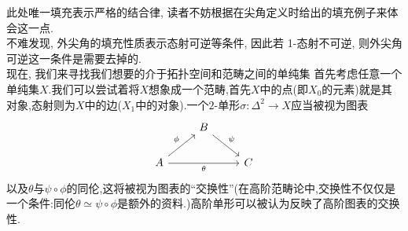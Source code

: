 此处唯一填充表示严格的结合律, 读者不妨根据在尖角定义时给出的填充例子来体会这一点.\\
不难发现, 外尖角的填充性质表示态射可逆等条件, 因此若 1-态射不可逆, 则外尖角可逆这一条件是需要去掉的.\\
现在, 我们来寻找我们想要的介于拓扑空间和范畴之间的单纯集
首先考虑任意一个单纯集$X$.我们可以尝试着将$X$想象成一个范畴,首先$X$中的点(即$X_0$的元素)就是其对象,态射则为$X$中的边($X_1$中的对象).一个$2$-单形$\sigma : \Delta^2 \to X$应当被视为图表
\[\begin{tikzcd}
	& B \\
	A && C
	\arrow["\psi", from=1-2, to=2-3]
	\arrow["\phi", from=2-1, to=1-2]
	\arrow["\theta"', from=2-1, to=2-3]
\end{tikzcd}\]
以及$\theta$与$\psi \circ \phi$的同伦,这将被视为图表的``交换性''(在高阶范畴论中,交换性不仅仅是一个条件:同伦$\theta \simeq \psi \circ \phi$是额外的资料.)高阶单形可以被认为反映了高阶图表的交换性.\\

